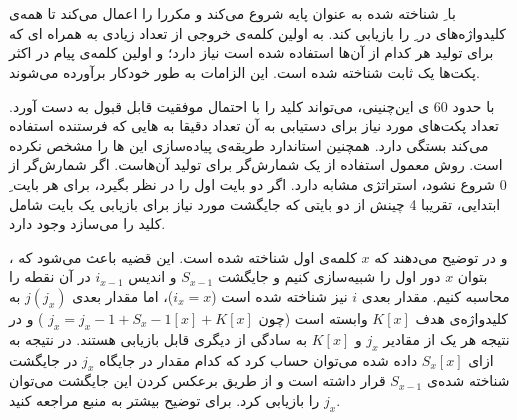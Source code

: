 \documentclass{article}
\begin{document}
\section{}
 با ِ شناخته شده به عنوان پایه شروع می‌کند و مکررا  را اعمال می‌کند تا همه‌ی کلیدواژه‌های در ِ را بازیابی کند.  به اولین کلمه‌ی خروجی از تعداد زیادی  به همراه ای که برای تولید هر کدام از آن‌ها استفاده شده است نیاز دارد؛ و اولین کلمه‌ی پیام در اکثر پکت‌ها یک ثابت شناخته شده است. این الزامات به طور خودکار برآورده می‌شوند.

با حدود 60 ی این‌چنینی،  می‌تواند کلید را با احتمال موفقیت قابل قبول به دست آورد. تعداد پکت‌های مورد نیاز برای دستیابی به آن تعداد  دقیقا به هایی که فرستنده استفاده می‌کند بستگی دارد. همچنین استاندارد  طریقه‌ی پیاده‌سازی این ها را مشخص نکرده است. روش معمول استفاده از یک شمارش‌گر برای تولید آن‌هاست. اگر شمارش‌گر از 0 شروع نشود،  استراتژی مشابه دارد. اگر  دو بایت اول  را در نظر بگیرد، برای هر بایت ِ ابتدایی، تقریبا  
4 چینش از دو بایتی که جایگشت مورد نیاز برای بازیابی یک بایت شامل کلید را می‌سازد وجود دارد.

،  و  در  توضیح می‌دهند که $x$ کلمه‌ی اول  شناخته شده است. این قضیه باعث می‌شود که بتوان $x$ دور اول  را شبیه‌سازی کنیم و جایگشت $S_{x-1}$ و اندیس $i_{x-1}$ در آن نقطه را محاسبه کنیم. مقدار بعدی $i$ نیز شناخته شده است ($i_x = x$)، اما مقدار بعدی $j(j_x)$ به کلیدواژه‌ی هدف $K\left[ x \right]$ وابسته است (چون
$j_x = j_x - 1 + S_x - 1 \left[ x \right] + K\left[ x \right]$
) و در نتیجه هر یک از مقادیر $j_x$ و $K\left[x\right]$ به سادگی از دیگری قابل بازیابی هستند. در نتیجه به ازای $S_x\left[x\right]$ داده شده می‌توان حساب کرد که کدام مقدار در جایگاه $j_x$ در جایگشت شناخته شده‌ی $S_{x-1}$ قرار داشته است و از طریق برعکس کردن این جایگشت می‌توان $j_x$ را بازیابی کرد. برای توضیح بیشتر به منبع مراجعه کنید.






\end{document}
